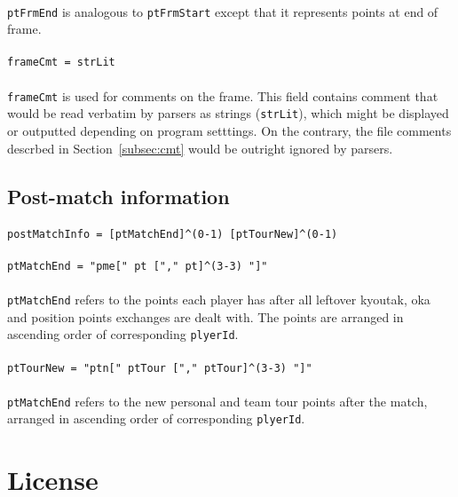 \documentclass[%
	a4paper%
	,10pt%
	,twoside%
	,notitlepage%
]{article}%
\newcommand*{\ruleSymbol}{\textjapanese{⚠}}%
\newcommand*{\ruleMargin}{\marginpar{\flushright{}\ruleSymbol{}}}%
\newcommand*{\rulePar}{\paragraph*{\ruleMargin{}}}%
\begin{document}
			\paragraph*{}\lstinline/ptFrmEnd/ is analogous to \lstinline/ptFrmStart/ except that it represents points at end of frame. %
			\rulePar{}\lstinline/frameCmt = strLit/%
			\paragraph*{}\lstinline/frameCmt/ is used for comments on the frame. This field contains comment that would be read verbatim by parsers as strings (\lstinline/strLit/), which might be displayed or outputted depending on program setttings. On the contrary, the file comments descrbed in Section~\ref{subsec:cmt} would be outright ignored by parsers. %
	\subsection{Post-match information}%
		\rulePar{}\lstinline/postMatchInfo = [ptMatchEnd]^(0-1) [ptTourNew]^(0-1)/%
		\rulePar{}\lstinline/ptMatchEnd = "pme[" pt ["," pt]^(3-3) "]"/%
		\paragraph*{}\lstinline/ptMatchEnd/ refers to the points each player has after all leftover kyoutak, oka and position points exchanges are dealt with. The points are arranged in ascending order of corresponding \lstinline/plyerId/. %
		\rulePar{}\lstinline/ptTourNew = "ptn[" ptTour ["," ptTour]^(3-3) "]"/%
		\paragraph*{}\lstinline/ptMatchEnd/ refers to the new personal and team tour points after the match, arranged in ascending order of corresponding \lstinline/plyerId/. %
\appendix{}%
\clearpage{}%
\lstset{%
	deleteindex=[1][keywords]%
}%
\section{License}\label{sec:license}%
% 
\end{document}
